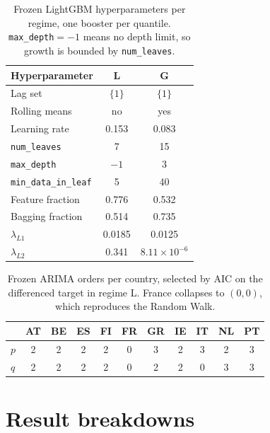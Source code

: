 \begin{table}[htbp]
  \centering\small
  \caption{Frozen LightGBM hyperparameters per regime, one booster per quantile. \texttt{max\_depth}${}=-1$ means no depth limit, so growth is bounded by \texttt{num\_leaves}.}
  \label{tab:app_frozen_lgbm}
  \begin{tabular}{@{}lcc@{}}
    \toprule
    \textbf{Hyperparameter} & \textbf{L} & \textbf{G} \\
    \midrule
    Lag set              & $\{1\}$ & $\{1\}$ \\
    Rolling means        & no    & yes \\
    Learning rate        & 0.153 & 0.083 \\
    \texttt{num\_leaves} & 7     & 15 \\
    \texttt{max\_depth}  & $-1$  & 3 \\
    \texttt{min\_data\_in\_leaf} & 5 & 40 \\
    Feature fraction     & 0.776 & 0.532 \\
    Bagging fraction     & 0.514 & 0.735 \\
    $\lambda_{L1}$       & 0.0185 & 0.0125 \\
    $\lambda_{L2}$       & 0.341 & $8.11\times10^{-6}$ \\
    \bottomrule
  \end{tabular}
\end{table}

\begin{table}[htbp]
  \centering\small
  \caption{Frozen ARIMA orders per country, selected by AIC on the differenced target in regime L. France collapses to $(0,0)$, which reproduces the Random Walk.}
  \label{tab:app_frozen_arma}
  \begin{tabular}{@{}lcccccccccc@{}}
    \toprule
    & AT & BE & ES & FI & FR & GR & IE & IT & NL & PT \\
    \midrule
    $p$ & 2 & 2 & 2 & 2 & 0 & 3 & 2 & 3 & 2 & 3 \\
    $q$ & 2 & 2 & 2 & 2 & 0 & 2 & 2 & 0 & 3 & 3 \\
    \bottomrule
  \end{tabular}
\end{table}

\section{Result breakdowns}
\label{app:breakdowns}

